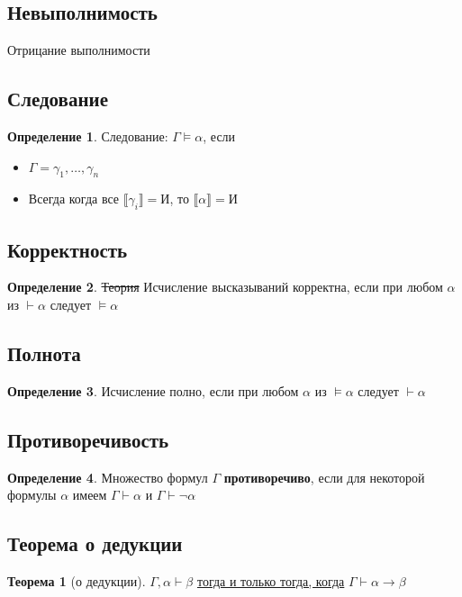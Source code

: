 \documentclass[english]{article}
\newcommand{\llb}{\llbracket}
\newcommand{\rrb}{\rrbracket}
\theoremstyle{plain}
\theoremstyle{remark}
\theoremstyle{definition}
\newtheorem{theorem}{Теорема}[section]
\newtheorem*{definition}{Определение}
\begin{document}
\subsection{Невыполнимость}
\label{sec:orgf5bd85c}
Отрицание выполнимости
\subsection{Следование}
\label{sec:org6e2a293}
\begin{definition}
Следование: \(\Gamma \vDash \alpha\), если
\begin{itemize}
\item \(\Gamma = \gamma_1, \dots, \gamma_n\)
\item Всегда когда все \(\llb \gamma_i \rrb = \text{И}\), то \(\llb \alpha \rrb = \text{И}\)
\end{itemize}
\label{orgf0e0032}
\end{definition}
\subsection{Корректность}
\label{sec:orge2e46f4}
\begin{definition}
\sout{Теория} Исчисление высказываний корректна, если при любом \(\alpha\) из \(\vdash \alpha\) следует \(\vDash \alpha\)
\label{orgb0b428e}
\end{definition}
\subsection{Полнота}
\label{sec:org08e3e86}
\begin{definition}
Исчисление полно, если при любом \(\alpha\) из \(\vDash \alpha\) следует \(\vdash \alpha\)
\label{org427278f}
\end{definition}
\subsection{Противоречивость}
\label{sec:org18a301f}
\begin{definition}
Множество формул \(\Gamma\) \textbf{противоречиво}, если для некоторой
формулы \(\alpha\) имеем \(\Gamma \vdash \alpha\) и \(\Gamma \vdash
\neg \alpha\)
\end{definition}
\subsection{Теорема о дедукции}
\label{sec:org5727066}
\begin{theorem}[о дедукции]
\(\Gamma, \alpha \vdash \beta\) \uline{тогда и только тогда, когда} \(\Gamma \vdash \alpha \to \beta\)
\label{org532215c}
\end{theorem}
\end{document}
